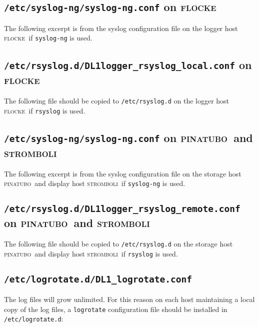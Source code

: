 \documentclass[twoside]{article}
\newcommand{\Dloggerhost}{\textsc{flocke}}
\newcommand{\Dstoragehost}{\textsc{pinatubo}}
\newcommand{\Ddisplayhost}{\textsc{stromboli}}
\begin{document}
\subsection{\texttt{/etc/syslog-ng/syslog-ng.conf} on \Dloggerhost}
\label{sec:conf:syslog:logger}
The following excerpt is from the syslog configuration file on the logger host
\Dloggerhost\ if \texttt{syslog-ng} is used.


\subsection{\texttt{/etc/rsyslog.d/DL1logger\_rsyslog\_local.conf} on
\Dloggerhost}
The following file should be copied to \texttt{/etc/rsyslog.d}
on the logger host \Dloggerhost\ if \texttt{rsyslog} is used.

\subsection{\texttt{/etc/syslog-ng/syslog-ng.conf} on \Dstoragehost\ and
\Ddisplayhost}
\label{sec:conf:syslog:display}
The following excerpt is from the syslog configuration file on the 
storage host \Dstoragehost\  and display host \Ddisplayhost\ if
\texttt{syslog-ng} is used.


\subsection{\texttt{/etc/rsyslog.d/DL1logger\_rsyslog\_remote.conf} on
\Dstoragehost\ and \Ddisplayhost}
\label{sec:conf:rsyslog:display}
The following file should be copied to \texttt{/etc/rsyslog.d}
on the storage host \Dstoragehost\  and display host \Ddisplayhost\ if
\texttt{rsyslog} is used.


\subsection{\texttt{/etc/logrotate.d/DL1\_logrotate.conf}}
\label{sec:conf:syslog:logrotate}
The log files will grow unlimited.
For this reason on each host maintaining a local copy of the log files,
a \texttt{logrotate} configuration file should be installed in 
\texttt{/etc/logrotate.d}:

\end{document}
